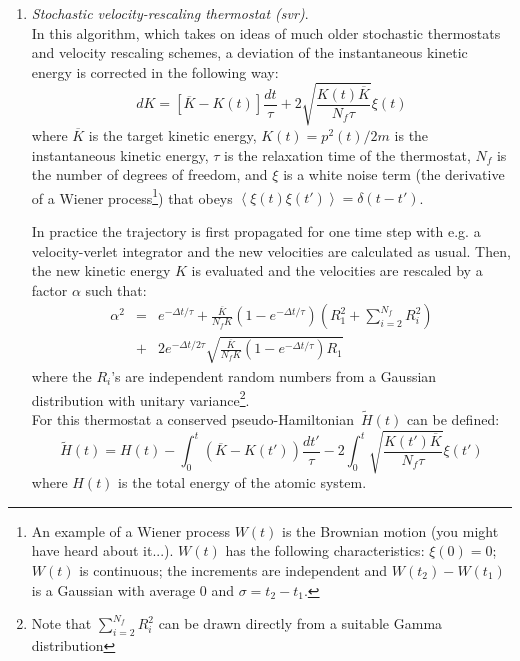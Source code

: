 \documentclass[a4paper,11pt]{scrartcl}
\begin{document}
\begin{enumerate}
\item \textit{Stochastic velocity-rescaling thermostat (svr)}\cite{bdp}. \\
In this algorithm, which takes on ideas of much older stochastic thermostats\cite{frenkel-smit,andersen} and velocity rescaling schemes\cite{berendsen}, a deviation of the instantaneous kinetic energy is corrected in the following way:
\begin{equation}
 dK =  \left[\overline{K} - K(t)\right] \frac{dt}{\tau} + 2 \sqrt{\frac{K(t)\overline{K}}{N_f\tau}}\xi(t)
\end{equation}
where $\overline{K}$ is the target kinetic energy, $K(t) = p^2(t)/2m$ is the instantaneous kinetic energy, $\tau$ is the relaxation time of the thermostat, $N_f$ is the number of degrees of freedom, and $\xi$ is a white noise term (the derivative of a Wiener process\footnote{An example of a Wiener process $W(t)$ is the Brownian motion (you might have heard about it...). $W(t)$ has the following characteristics: $\xi(0) = 0$; $W(t)$ is continuous; the increments are independent and $W(t_2)-W(t_1)$ is a Gaussian with average 0 and $\sigma=t_2-t_1$.}) that obeys $ \left\langle \xi(t) \xi(t') \right\rangle = \delta(t-t')$.

In practice the trajectory is first propagated for one time step with e.g. a velocity-verlet integrator and the new velocities are calculated as usual. Then, the new kinetic energy $K$ is evaluated and the velocities are rescaled by a factor $\alpha$ such that:
\begin{eqnarray}
\nonumber \alpha^2 &=& e^{-\Delta t/\tau}+\frac{\overline{K}}{N_f K}\left( 1-e^{-\Delta t/\tau}\right) \left( R_1^2 + \sum_{i=2}^{N_f}R_i^2\right)\\
\nonumber &+& 2e^{-\Delta t/ 2\tau} \sqrt{\frac{\overline{K}}{N_f K} \left( 1-e^{-\Delta t/\tau}\right) R_1}
\end{eqnarray}
where the $R_i$'s are independent random numbers from a Gaussian distribution with unitary variance\footnote{Note that $\sum_{i=2}^{N_f}R_i^2$ can be drawn directly from a suitable Gamma distribution}.\\

For this thermostat a conserved pseudo-Hamiltonian~$\tilde{H}(t)$ can be defined:
\begin{equation}
\nonumber \tilde{H}(t) = H(t) - \int_0^t \left( \overline{K} - K(t')\right) \frac{dt'}{\tau} -2\int_0^{t} \sqrt{\frac{K(t')\overline{K}}{N_f\tau}}\xi(t')
\end{equation}
where $H(t)$ is the total energy of the atomic system. 




\end{enumerate}
\end{document}
